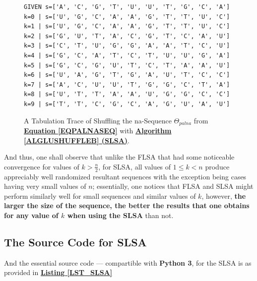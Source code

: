 \documentclass[a4paper, 18pt]{book} %
\begin{document}
\begin{figure}[H]
  \begin{center}
\Large
\begin{verbatim}
GIVEN s=['A', 'C', 'G', 'T', 'U', 'U', 'T', 'G', 'C', 'A']
k=0 | s=['U', 'G', 'C', 'A', 'A', 'G', 'T', 'T', 'U', 'C']
k=1 | s=['U', 'G', 'C', 'A', 'A', 'G', 'T', 'T', 'U', 'C']
k=2 | s=['G', 'U', 'T', 'A', 'C', 'G', 'T', 'C', 'A', 'U']
k=3 | s=['C', 'T', 'U', 'G', 'G', 'A', 'A', 'T', 'C', 'U']
k=4 | s=['G', 'C', 'A', 'T', 'C', 'T', 'U', 'U', 'G', 'A']
k=5 | s=['G', 'C', 'G', 'U', 'T', 'C', 'T', 'A', 'A', 'U']
k=6 | s=['U', 'A', 'G', 'T', 'G', 'A', 'U', 'T', 'C', 'C']
k=7 | s=['A', 'C', 'U', 'U', 'T', 'G', 'G', 'C', 'T', 'A']
k=8 | s=['U', 'T', 'T', 'A', 'A', 'U', 'G', 'G', 'C', 'C']
k=9 | s=['T', 'T', 'C', 'G', 'C', 'A', 'G', 'U', 'A', 'U']
\end{verbatim}

   \caption{A Tabulation Trace of Shuffling the na-Sequence $\Theta_{palna}$ from \textbf{\hyperref[EQPALNASEQ]{Equation \ref{EQPALNASEQ}}} with \textbf{\hyperref[ALGLUSHUFFLEB]{Algorithm \ref{ALGLUSHUFFLEB} (SLSA)}}.}
  \label{FIGTRACESLSAPALNA}
  \end{center}
\end{figure}


And thus, one shall observe that unlike the FLSA that had some noticeable convergence for values of $k > \frac{n}{2}$, for SLSA, all values of $1 \leq k < n$ produce appreciably well randomized resultant sequences with the exception being cases having very small values of $n$; essentially, one notices that FLSA and SLSA might perform similarly well for small sequences and similar values of $k$, however, \textbf{the larger the size of the sequence, the better the results that one obtains for any value of $k$ when using the SLSA} than not.


\subsection{The Source Code for SLSA}
\label{SECSLSACODE}

And the essential source code --- compartible with \textbf{Python 3}, for the SLSA is as provided in  \textbf{\hyperref[LST_SLSA]{Listing \ref{LST_SLSA}}}
\end{document}
